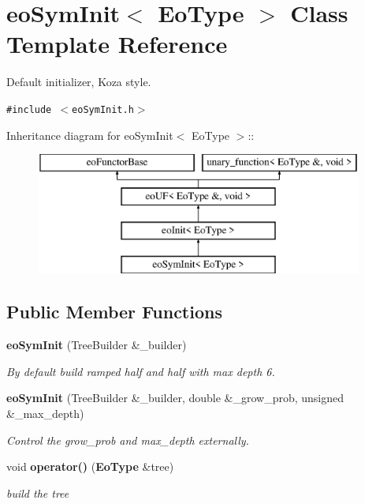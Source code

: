 \section{eo\-Sym\-Init$<$ Eo\-Type $>$ Class Template Reference}
\label{classeo_sym_init}
Default initializer, Koza style.  


{\tt \#include $<$eo\-Sym\-Init.h$>$}

Inheritance diagram for eo\-Sym\-Init$<$ Eo\-Type $>$::\begin{figure}[H]
\begin{center}
\leavevmode
\includegraphics[height=4cm]{classeo_sym_init}
\end{center}
\end{figure}
\subsection*{Public Member Functions}
\begin{CompactItemize}
\item 
{\bf eo\-Sym\-Init} (Tree\-Builder \&\_\-builder)\label{classeo_sym_init_a0}

\begin{CompactList}\small\item\em By default build ramped half and half with max depth 6. \item\end{CompactList}\item 
{\bf eo\-Sym\-Init} (Tree\-Builder \&\_\-builder, double \&\_\-grow\_\-prob, unsigned \&\_\-max\_\-depth)\label{classeo_sym_init_a1}

\begin{CompactList}\small\item\em Control the grow\_\-prob and max\_\-depth externally. \item\end{CompactList}\item 
void {\bf operator()} ({\bf Eo\-Type} \&tree)\label{classeo_sym_init_a2}

\begin{CompactList}\small\item\em build the tree \item\end{CompactList}\end{CompactItemize}
